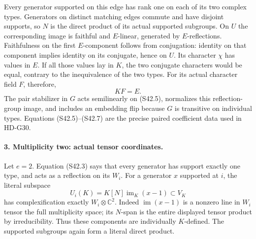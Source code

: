 Every generator supported on this edge has rank one on
each of its two complex types. Generators on distinct matching
edges commute and have disjoint supports, so \(N\) is the
direct product of its actual supported subgroups. On \(U\)
the corresponding image is faithful and \(E\)-linear,
generated by \(E\)-reflections. Faithfulness on the first
\(E\)-component follows from conjugation: identity on that
component implies identity on its conjugate, hence on \(U\).
Its character \(\chi\) has values in \(E\). If all
those values lay in \(K\), the two conjugate characters
would be equal, contrary to the inequivalence of the two
types. For its actual character field \(F\), therefore,
\[
                               KF=E.                       \tag{S42.7}
\]
The pair stabilizer in \(G\) acts semilinearly on (S42.5),
normalizes this reflection-group image, and includes an
embedding flip because \(G\) is transitive on individual
types. Equations (S42.5)--(S42.7) are the precise paired
coefficient data used in HD-G30.

\paragraph{3. Multiplicity two: actual tensor coordinates.}
Let \(e=2\). Equation (S42.3) says that every generator
has support exactly one type, and acts as a reflection on
its \(W_i\). For a generator \(x\) supported at \(i\),
the literal subspace
\[
        U_i(K)=K[N]\operatorname{im}_K(x-1)\subset V_K
                                                               \tag{S42.8}
\]
has complexification exactly \(W_i\otimes\mathbb C^2\).
Indeed \(\operatorname{im}(x-1)\) is a nonzero line in
\(W_i\) tensor the full multiplicity space; its \(N\)-span
is the entire displayed tensor product by irreducibility.
Thus these components are individually \(K\)-defined.
The supported subgroups again form a literal direct product.

